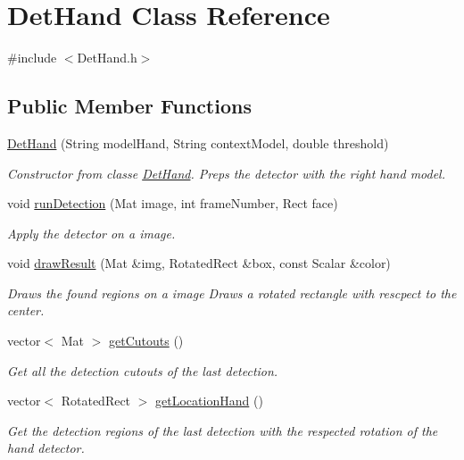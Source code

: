 \hypertarget{class_det_hand}{\section{Det\-Hand Class Reference}
\label{class_det_hand}
}


{\ttfamily \#include $<$Det\-Hand.\-h$>$}

\subsection*{Public Member Functions}
\begin{DoxyCompactItemize}
\item 
\hyperlink{class_det_hand_ae2db0bd3a42211dd7f85aa484163fb51}{Det\-Hand} (String model\-Hand, String context\-Model, double threshold)
\begin{DoxyCompactList}\small\item\em Constructor from classe \hyperlink{class_det_hand}{Det\-Hand}. Preps the detector with the right hand model. \end{DoxyCompactList}\item 
void \hyperlink{class_det_hand_a2ff6d2defe5cb9fb6d478a113dd07800}{run\-Detection} (Mat image, int frame\-Number, Rect face)
\begin{DoxyCompactList}\small\item\em Apply the detector on a image. \end{DoxyCompactList}\item 
void \hyperlink{class_det_hand_a04ca17b97c142aaeb4e687a3bcc23cd4}{draw\-Result} (Mat \&img, Rotated\-Rect \&box, const Scalar \&color)
\begin{DoxyCompactList}\small\item\em Draws the found regions on a image Draws a rotated rectangle with rescpect to the center. \end{DoxyCompactList}\item 
vector$<$ Mat $>$ \hyperlink{class_det_hand_afcb69946411c9c656f3203b6bbc4e13a}{get\-Cutouts} ()
\begin{DoxyCompactList}\small\item\em Get all the detection cutouts of the last detection. \end{DoxyCompactList}\item 
vector$<$ Rotated\-Rect $>$ \hyperlink{class_det_hand_a6d30403a8d530c2169b2ddbe5d5bdac6}{get\-Location\-Hand} ()
\begin{DoxyCompactList}\small\item\em Get the detection regions of the last detection with the respected rotation of the hand detector. \end{DoxyCompactList}\item 

\end{DoxyCompactItemize}
